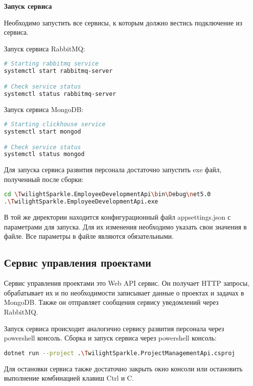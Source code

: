 \bigskip
\textbf{Запуск сервиса}

Необходимо запустить все сервисы, к которым должно вестись подключение из сервиса.

Запуск сервиса RabbitMQ:

\begin{lstlisting}[language=bash]
# Starting rabbitmq service
systemctl start rabbitmq-server

# Check service status
systemctl status rabbitmq-server
\end{lstlisting}

Запуск сервиса MongoDB:

\begin{lstlisting}[language=bash]
# Starting clickhouse service
systemctl start mongod

# Check service status
systemctl status mongod
\end{lstlisting}

Для запуска сервиса развития персонала достаточно запустить exe файл, полученный после сборки:

\begin{lstlisting}[language=bash]
cd \TwilightSparkle.EmployeeDevelopmentApi\bin\Debug\net5.0
.\TwilightSparkle.EmployeeDevelopmentApi.exe
\end{lstlisting}

В той же директории находится конфигурационный файл appsettings.json с параметрами для запуска. Для их изменения необходимо указать свои значения в файле. Все параметры в файле являются обязательными.


\subsection{Сервис управления проектами}

Сервис управления проектами это Web API сервис. Он получает HTTP запросы, обрабатывает их и по необходимости записывает данные о проектах и задачах в MongoDB. Также он отправляет сообщения сервису уведомлений через RabbitMQ.

Запуск сервиса происходит аналогично сервису развития персонала через powershell консоль. Сборка и запуск сервиса через powershell консоль:

\begin{lstlisting}[language=bash]
dotnet run --project .\TwilightSparkle.ProjectManagementApi.csproj
\end{lstlisting}

Для остановки сервиса также достаточно закрыть окно консоли или остановить выполнение комбинацией клавиш Ctrl и C.

